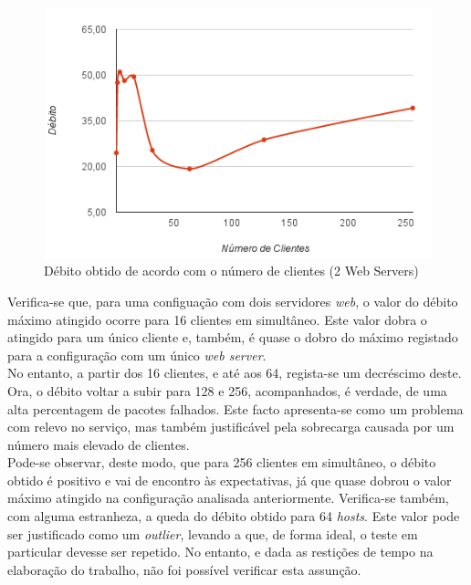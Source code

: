 \newpage

\begin{figure}[!h]
\centering
\includegraphics[scale=.6]{img/ab/web2.png}
\caption{Débito obtido de acordo com o número de clientes (2 Web Servers)}
\end{figure}


Verifica-se que, para uma configuação com dois servidores \textit{web}, o valor do débito máximo atingido ocorre para 16 clientes em simultâneo.
Este valor dobra o atingido para um único cliente e, também, é quase o dobro do máximo registado para a configuração com um único \textit{web server}. \\

No entanto, a partir dos 16 clientes, e até aos 64, regista-se um decréscimo deste.
Ora, o débito voltar a subir para 128 e 256, acompanhados, é verdade, de uma alta percentagem de pacotes falhados.
Este facto apresenta-se como um problema com relevo no serviço, mas também justificável pela sobrecarga causada por um número mais elevado de clientes. \\

Pode-se observar, deste modo, que para 256 clientes em simultâneo, o débito obtido é positivo e vai de encontro às expectativas, já que quase dobrou o valor máximo atingido na configuração analisada anteriormente.
Verifica-se também, com alguma estranheza, a queda do débito obtido para 64 \textit{hosts}.
Este valor pode ser justificado como um \textit{outlier}, levando a que, de forma ideal, o teste em particular devesse ser repetido.
No entanto, e dada as restições de tempo na elaboração do trabalho, não foi possível verificar esta assunção.

